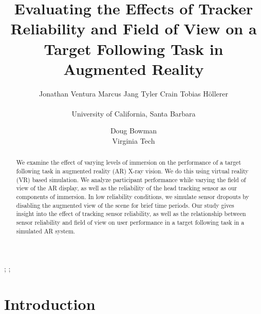 \documentclass{acmsiggraph}                     %
\title{Evaluating the Effects of Tracker Reliability and Field of View on a Target Following Task in Augmented Reality}
\author{
\begin{tabular}{cccc}
Jonathan Ventura\hspace{12pt}
Marcus Jang\hspace{12pt}
Tyler Crain\hspace{12pt}
Tobias H\"{o}llerer\hspace{12pt}
\end{tabular}\\University of California, Santa Barbara
\and Doug Bowman\\Virginia Tech
}
\begin{document}


\maketitle


\begin{abstract}

We examine the effect of varying levels of immersion on the performance of a target following task in augmented reality (AR) X-ray vision.  We do this using virtual reality (VR) based simulation.  We analyze participant performance while varying the field of view of the AR display, as well as the reliability of the head tracking sensor as our components of immersion.  In low reliability conditions, we simulate sensor dropouts by disabling the augmented view of the scene for brief time periods.  Our study gives insight into the effect of tracking sensor reliability, as well as the relationship between sensor reliability and field of view on user performance in a target following task in a simulated AR system.

\end{abstract}


\begin{CRcatlist}
  ;
  ;
\end{CRcatlist}

\keywordlist

\section{Introduction}

\end{document}
